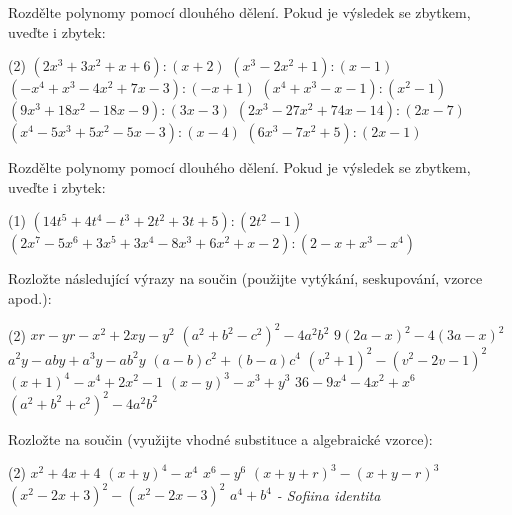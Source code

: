 \documentclass[12pt,a4paper]{article}
\begin{document}
\begin{exercise}
    Rozdělte polynomy pomocí dlouhého dělení. Pokud je výsledek se zbytkem, uveďte i zbytek:
    \begin{tasks}(2)
        \task $(2x^3 + 3x^2 + x + 6) : (x + 2)$
        \task $(x^3 - 2x^2 + 1) : (x - 1)$
        \task $(-x^4 + x^3 - 4x^2 + 7x - 3) : (-x + 1)$
        \task $(x^4 + x^3 - x - 1) : (x^2 - 1)$
        \task $(9x^3 + 18x^2 - 18x - 9) : (3x - 3)$
        \task $(2x^3 - 27x^2 + 74x - 14) : (2x - 7)$
        \task $(x^4 - 5x^3 + 5x^2 - 5x - 3) : (x - 4)$
        \task $(6x^3 - 7x^2 + 5) : (2x - 1)$
    \end{tasks}
\end{exercise}

\begin{exercise}
    Rozdělte polynomy pomocí dlouhého dělení. Pokud je výsledek se zbytkem, uveďte i zbytek:
    \begin{tasks}(1)
        \task $(14t^5 + 4t^4 - t^3 +2t^2 +3t +5):(2t^2 -1)$
        \task $(2x^7 - 5x^6 + 3x^5 + 3x^4 - 8x^3 + 6x^2 + x - 2) : (2 - x + x^3 - x^4)$
    \end{tasks}
\end{exercise}


\begin{exercise}
    Rozložte následující výrazy na součin (použijte vytýkání, seskupování, vzorce apod.):
    \begin{tasks}(2)
        \task $xr - yr - x^2 + 2xy - y^2$
        \task $(a^2 + b^2 - c^2)^2 - 4a^2b^2$
        \task $9(2a - x)^2 - 4(3a - x)^2$
        \task $a^2y - aby + a^3y - ab^2y$
        \task $(a-b)c^2 + (b-a)c^4$
        \task $(v^2 + 1)^2 - (v^2 - 2v - 1)^2$
        \task $(x+1)^4 - x^4 + 2x^2 - 1$
        \task $(x-y)^3 - x^3 + y^3$
        \task $36 - 9x^4 - 4x^2 + x^6$
        \task $(a^2 +b^2 +c^2)^2 -4a^2b^2$
    \end{tasks}
\end{exercise}


\begin{exercise}
    Rozložte na součin (využijte vhodné substituce a algebraické vzorce):
    \begin{tasks}(2)
        \task $x^2 + 4x + 4$
        \task $(x + y)^4 - x^4$
        \task $x^6 - y^6$
        \task $(x + y + r)^3 - (x + y - r)^3$
        \task $(x^2 - 2x + 3)^2 - (x^2 - 2x - 3)^2$
        \task $a^4 + b^4$ \; \;\emph{ - Sofiina identita}
    \end{tasks}
\end{exercise}
\end{document}
